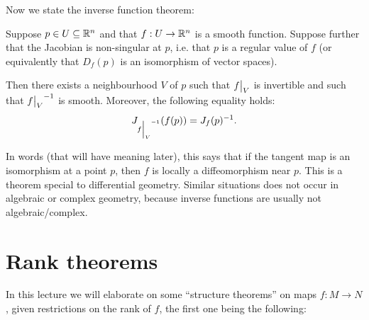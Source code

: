 \documentclass[11pt, english]{article}
\begin{document}
Now we state the inverse function theorem:
\begin{thm}
Suppose $p \in U \subseteq \mathbb{R}^n$ and that $f:U \to \mathbb{R}^n$ is a smooth function. Suppose further that the Jacobian is non-singular at $p$, i.e. that $p$ is a regular value of $f$ (or equivalently that $D_f(p)$ is an isomorphism of vector spaces).

Then there exists a neighbourhood $V$ of $p$ such that $\restr fV$ is invertible and such that $\restr fV^{-1}$ is smooth. Moreover, the following equality holds:
\[
J_{\restr fV^{-1}}(f(p)) = J_f(p)^{-1}.
\]
\end{thm}

In words (that will have meaning later), this says that if the tangent map is an isomorphism at a point $p$, then $f$ is locally a diffeomorphism near $p$. This is a theorem special to differential geometry. Similar situations does not occur in algebraic or complex geometry, because inverse functions are usually not algebraic/complex.


\pagebreak
\section{Rank theorems}

In this lecture we will elaborate on some ``structure theorems'' on maps $f\colon M \to N$, given restrictions on the rank of $f$, the first one being the following:
\end{document}
